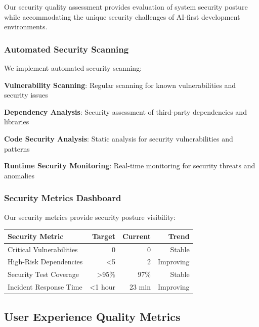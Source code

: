 Our security quality assessment provides evaluation of system security posture while accommodating the unique security challenges of AI-first development environments.

\subsubsection*{Automated Security Scanning}

We implement automated security scanning:

\begin{expandedlist}
    \item \textbf{Vulnerability Scanning}: Regular scanning for known vulnerabilities and security issues
    \item \textbf{Dependency Analysis}: Security assessment of third-party dependencies and libraries
    \item \textbf{Code Security Analysis}: Static analysis for security vulnerabilities and patterns
    \item \textbf{Runtime Security Monitoring}: Real-time monitoring for security threats and anomalies
\end{expandedlist}

\subsubsection*{Security Metrics Dashboard}

Our security metrics provide security posture visibility:

\begin{center}
\begin{tabular}{@{}lrrr@{}}
\toprule
\textbf{Security Metric} & \textbf{Target} & \textbf{Current} & \textbf{Trend} \\
\midrule
Critical Vulnerabilities & 0 & 0 & Stable \\
High-Risk Dependencies & <5 & 2 & Improving \\
Security Test Coverage & >95\% & 97\% & Stable \\
Incident Response Time & <1 hour & 23 min & Improving \\
\bottomrule
\end{tabular}
\end{center}

\subsection*{User Experience Quality Metrics}

